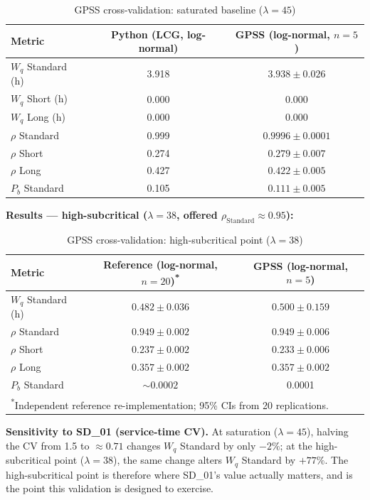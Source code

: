 \documentclass[11pt,a4paper]{article}
\newcommand{\Wq}{\ensuremath{W_q}}
\newcommand{\Pb}{\ensuremath{P_b}}
\newcommand{\lam}{\ensuremath{\lambda}}
\begin{document}
\begin{table}[H]
\centering
\caption{GPSS cross-validation: saturated baseline ($\lam=45$)}
\begin{tabular}{lcc}
\toprule
\textbf{Metric} & \textbf{Python (LCG, log-normal)} & \textbf{GPSS (log-normal, $n=5$)} \\
\midrule
$\Wq$ Standard (h) & 3.918 & $3.938 \pm 0.026$ \\
$\Wq$ Short (h)    & 0.000 & 0.000             \\
$\Wq$ Long (h)     & 0.000 & 0.000             \\
$\rho$ Standard    & 0.999 & $0.9996 \pm 0.0001$ \\
$\rho$ Short       & 0.274 & $0.279 \pm 0.007$   \\
$\rho$ Long        & 0.427 & $0.422 \pm 0.005$   \\
$\Pb$ Standard     & 0.105 & $0.111 \pm 0.005$   \\
\bottomrule
\end{tabular}
\end{table}

\textbf{Results — high-subcritical ($\lam=38$, offered $\rho_\text{Standard} \approx 0.95$):}

\begin{table}[H]
\centering
\caption{GPSS cross-validation: high-subcritical point ($\lam=38$)}
\begin{tabular}{lcc}
\toprule
\textbf{Metric} & \textbf{Reference (log-normal, $n=20$)\textsuperscript{*}} & \textbf{GPSS (log-normal, $n=5$)} \\
\midrule
$\Wq$ Standard (h) & $0.482 \pm 0.036$ & $0.500 \pm 0.159$ \\
$\rho$ Standard    & $0.949 \pm 0.002$ & $0.949 \pm 0.006$ \\
$\rho$ Short       & $0.237 \pm 0.002$ & $0.233 \pm 0.006$ \\
$\rho$ Long        & $0.357 \pm 0.002$ & $0.357 \pm 0.002$ \\
$\Pb$ Standard     & ${\sim}0.0002$    & 0.0001            \\
\bottomrule
\multicolumn{3}{l}{\footnotesize \textsuperscript{*}Independent reference re-implementation; 95\% CIs from 20 replications.}
\end{tabular}
\end{table}

\textbf{Sensitivity to SD\_01 (service-time CV).} At saturation ($\lam=45$), halving the CV from 1.5 to
${\approx}0.71$ changes $\Wq$ Standard by only $-2\%$; at the high-subcritical point ($\lam=38$),
the same change alters $\Wq$ Standard by $+77\%$. The high-subcritical point is therefore where SD\_01's
value actually matters, and is the point this validation is designed to exercise.
\end{document}
